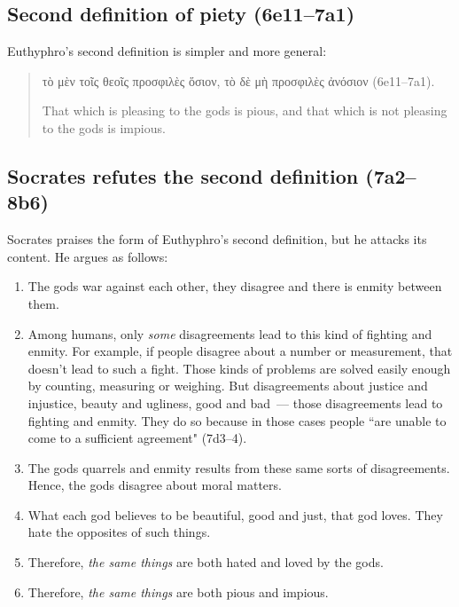 \documentclass[11pt]{article}
\begin{document}
\subsection{Second definition of piety (6e11--7a1)}

Euthyphro's second definition is simpler and more general:

\begin{quote}
    τὸ μὲν τοῖς θεοῖς προσφιλὲς ὅσιον, τὸ δὲ μὴ προσφιλὲς ἀνόσιον
    (6e11--7a1).

    That which is pleasing to the gods is pious, and that which is not
    pleasing to the gods is impious.
\end{quote}

\subsection{Socrates refutes the second definition (7a2--8b6)}

Socrates praises the form of Euthyphro's second definition, but he attacks
its content.  He argues as follows:

\begin{enumerate}
    \item The gods war against each other, they disagree and there is
        enmity between them.
    \item Among humans, only \emph{some} disagreements lead to this kind of
        fighting and enmity.  For example, if people disagree about
        a number or measurement, that doesn't lead to such a fight.  Those
        kinds of problems are solved easily enough by counting, measuring
        or weighing.  But disagreements about justice and injustice, beauty
        and ugliness, good and bad~--- those disagreements lead to fighting
        and enmity.  They do so because in those cases people ``are unable
        to come to a sufficient agreement" (7d3--4).
    \item The gods quarrels and enmity results from these same sorts of
        disagreements.  Hence, the gods disagree about moral matters.
    \item What each god believes to be beautiful, good and just, that god
        loves.  They hate the opposites of such things.
    \item Therefore, \emph{the same things} are both hated and loved by the
        gods.
    \item Therefore, \emph{the same things} are both pious and impious.
\end{enumerate}
\end{document}
